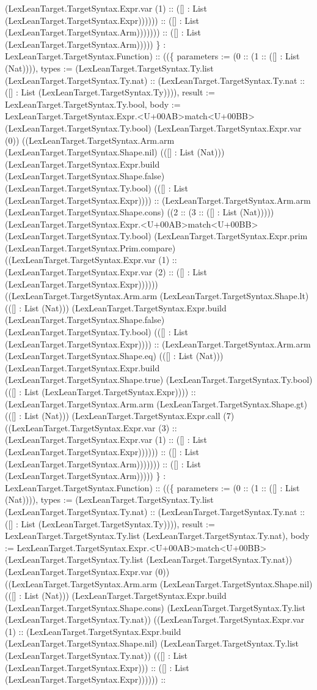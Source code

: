 \documentclass[11pt]{article}
\begin{document}
(LexLeanTarget.TargetSyntax.Expr.var (1) :: ([] : List (LexLeanTarget.TargetSyntax.Expr)))))) :: ([] : List (LexLeanTarget.TargetSyntax.Arm))))))) :: ([] : List (LexLeanTarget.TargetSyntax.Arm))))) \} : LexLeanTarget.TargetSyntax.Function) :: ((\{ parameters := (0 :: (1 :: ([] : List (Nat)))), types := (LexLeanTarget.TargetSyntax.Ty.list (LexLeanTarget.TargetSyntax.Ty.nat) :: (LexLeanTarget.TargetSyntax.Ty.nat :: ([] : List (LexLeanTarget.TargetSyntax.Ty)))), result := LexLeanTarget.TargetSyntax.Ty.bool, body := LexLeanTarget.TargetSyntax.Expr.<U+00AB>match<U+00BB> (LexLeanTarget.TargetSyntax.Ty.bool) (LexLeanTarget.TargetSyntax.Expr.var (0)) ((LexLeanTarget.TargetSyntax.Arm.arm (LexLeanTarget.TargetSyntax.Shape.nil) (([] : List (Nat))) (LexLeanTarget.TargetSyntax.Expr.build (LexLeanTarget.TargetSyntax.Shape.false) (LexLeanTarget.TargetSyntax.Ty.bool) (([] : List (LexLeanTarget.TargetSyntax.Expr)))) :: (LexLeanTarget.TargetSyntax.Arm.arm (LexLeanTarget.TargetSyntax.Shape.cons) ((2 :: (3 :: ([] : List (Nat))))) (LexLeanTarget.TargetSyntax.Expr.<U+00AB>match<U+00BB> (LexLeanTarget.TargetSyntax.Ty.bool) (LexLeanTarget.TargetSyntax.Expr.prim (LexLeanTarget.TargetSyntax.Prim.compare) ((LexLeanTarget.TargetSyntax.Expr.var (1) :: (LexLeanTarget.TargetSyntax.Expr.var (2) :: ([] : List (LexLeanTarget.TargetSyntax.Expr)))))) ((LexLeanTarget.TargetSyntax.Arm.arm (LexLeanTarget.TargetSyntax.Shape.lt) (([] : List (Nat))) (LexLeanTarget.TargetSyntax.Expr.build (LexLeanTarget.TargetSyntax.Shape.false) (LexLeanTarget.TargetSyntax.Ty.bool) (([] : List (LexLeanTarget.TargetSyntax.Expr)))) :: (LexLeanTarget.TargetSyntax.Arm.arm (LexLeanTarget.TargetSyntax.Shape.eq) (([] : List (Nat))) (LexLeanTarget.TargetSyntax.Expr.build (LexLeanTarget.TargetSyntax.Shape.true) (LexLeanTarget.TargetSyntax.Ty.bool) (([] : List (LexLeanTarget.TargetSyntax.Expr)))) :: (LexLeanTarget.TargetSyntax.Arm.arm (LexLeanTarget.TargetSyntax.Shape.gt) (([] : List (Nat))) (LexLeanTarget.TargetSyntax.Expr.call (7) ((LexLeanTarget.TargetSyntax.Expr.var (3) :: (LexLeanTarget.TargetSyntax.Expr.var (1) :: ([] : List (LexLeanTarget.TargetSyntax.Expr)))))) :: ([] : List (LexLeanTarget.TargetSyntax.Arm))))))) :: ([] : List (LexLeanTarget.TargetSyntax.Arm))))) \} : LexLeanTarget.TargetSyntax.Function) :: ((\{ parameters := (0 :: (1 :: ([] : List (Nat)))), types := (LexLeanTarget.TargetSyntax.Ty.list (LexLeanTarget.TargetSyntax.Ty.nat) :: (LexLeanTarget.TargetSyntax.Ty.nat :: ([] : List (LexLeanTarget.TargetSyntax.Ty)))), result := LexLeanTarget.TargetSyntax.Ty.list (LexLeanTarget.TargetSyntax.Ty.nat), body := LexLeanTarget.TargetSyntax.Expr.<U+00AB>match<U+00BB> (LexLeanTarget.TargetSyntax.Ty.list (LexLeanTarget.TargetSyntax.Ty.nat)) (LexLeanTarget.TargetSyntax.Expr.var (0)) ((LexLeanTarget.TargetSyntax.Arm.arm (LexLeanTarget.TargetSyntax.Shape.nil) (([] : List (Nat))) (LexLeanTarget.TargetSyntax.Expr.build (LexLeanTarget.TargetSyntax.Shape.cons) (LexLeanTarget.TargetSyntax.Ty.list (LexLeanTarget.TargetSyntax.Ty.nat)) ((LexLeanTarget.TargetSyntax.Expr.var (1) :: (LexLeanTarget.TargetSyntax.Expr.build (LexLeanTarget.TargetSyntax.Shape.nil) (LexLeanTarget.TargetSyntax.Ty.list (LexLeanTarget.TargetSyntax.Ty.nat)) (([] : List (LexLeanTarget.TargetSyntax.Expr))) :: ([] : List (LexLeanTarget.TargetSyntax.Expr)))))) :: 
\end{document}
